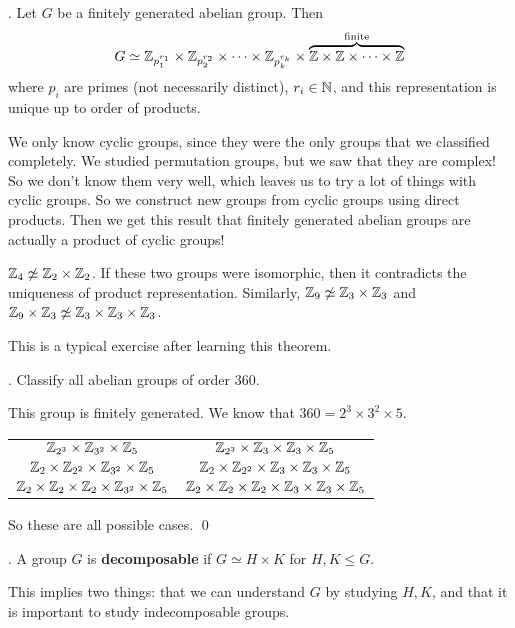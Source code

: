 \thm.  Let \(G\) be a finitely generated abelian group. Then
\[
    G \simeq\mathbb{Z}_{p_1^{r_1}} \times \mathbb{Z}_{p_2^{r_2}} \times \cdots \times \mathbb{Z}_{p_k^{r_k}} \times \overbrace{\mathbb{Z} \times \mathbb{Z} \times \cdots \times \mathbb{Z}}^{\text{finite}}
\]
where \(p_i\) are primes (not necessarily distinct), \(r_i \in \mathbb{N}\), and this representation is unique up to order of products.

We only know cyclic groups, since they were the only groups that we classified completely. We studied permutation groups, but we saw that they are complex! So we don't know them very well, which leaves us to try a lot of things with cyclic groups. So we construct new groups from cyclic groups using direct products. Then we get this result that finitely generated abelian groups are actually a product of cyclic groups!

\rmk \(\mathbb{Z}_4 \not\simeq \mathbb{Z}_2 \times \mathbb{Z}_2\). If these two groups were isomorphic, then it contradicts the uniqueness of product representation. Similarly, \(\mathbb{Z}_9 \not\simeq \mathbb{Z}_3 \times \mathbb{Z}_3\) and \(\mathbb{Z}_9 \times \mathbb{Z}_3 \not\simeq \mathbb{Z}_3 \times \mathbb{Z}_3 \times \mathbb{Z}_3\).

This is a typical exercise after learning this theorem.

\ex. Classify all abelian groups of order 360.

\pf This group is finitely generated. We know that \(360 = 2^3 \times 3^2 \times 5\).
\begin{center}
    \begin{tabular}{cc}
        \(\mathbb{Z}_{2^3} \times \mathbb{Z}_{3^2} \times \mathbb{Z}_5\)                           & \(\mathbb{Z}_{2^3} \times \mathbb{Z}_3 \times \mathbb{Z}_3 \times \mathbb{Z}_5\)                           \\
        \(\mathbb{Z}_{2} \times \mathbb{Z}_{2^2} \times \mathbb{Z}_{3^2} \times \mathbb{Z}_5\)             & \(\mathbb{Z}_{2} \times \mathbb{Z}_{2^2} \times \mathbb{Z}_3 \times \mathbb{Z}_3 \times \mathbb{Z}_5\)             \\
        \(\mathbb{Z}_{2} \times \mathbb{Z}_{2} \times \mathbb{Z}_{2} \times \mathbb{Z}_{3^2} \times \mathbb{Z}_5\) & \(\mathbb{Z}_{2} \times \mathbb{Z}_{2} \times \mathbb{Z}_{2} \times \mathbb{Z}_3 \times \mathbb{Z}_3 \times \mathbb{Z}_5\)
    \end{tabular}
\end{center}
So these are all possible cases. \qed

.  A group \(G\) is \textbf{decomposable} if \(G \simeq H \times K\) for \(H, K \leq G\).

This implies two things: that we can understand \(G\) by studying \(H, K\), and that it is important to study indecomposable groups.

